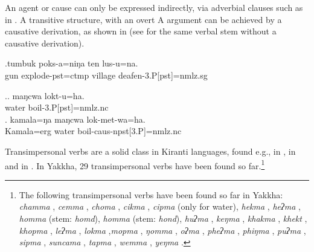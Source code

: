  An agent or cause can only be expressed indirectly, via adverbial clauses such as in \Next. A transitive structure, with an overt A argument can be achieved by a causative derivation, as shown in \NNext[b] (see \Next[a] for the same verbal stem without a causative derivation). 
 
 \exg.tumbuk poks-a=niŋa ten lus-u=na.\\
gun explode{\sc [3sg]-pst=ctmp} village  deafen{\sc -3.P[pst]=nmlz.sg}\\


 
\ex.\ag. maŋcwa lokt-u=ha.\\
water boil{\sc -3.P[pst]=nmlz.nc}\\
\bg. kamala=ŋa maŋcwa lok-met-wa=ha.\\
Kamala{\sc =erg} water boil{\sc -caus-npst[3.P]=nmlz.nc}\\


Transimpersonal verbs are a solid class in Kiranti languages, found e.g., in  \citep[451]{Driem1987A-grammar}, in  \citep[42]{Allen1975Sketch} and in  \citep[222]{Doornenbal2009A-grammar}. In Yakkha, 29 transimpersonal verbs have been found so far.\footnote{The following transimpersonal verbs have been found so far in Yakkha: \emph{chamma} , \emph{cemma} , \emph{choma} , \emph{cikma} ,  \emph{cipma}  (only for water),  \emph{hekma} , \emph{heʔma} , \emph{homma} (stem: \emph{homd}), \emph{homma}  (stem: \emph{hond}), \emph{huʔma} , \emph{keŋma} , \emph{khakma} , \emph{khekt} , \emph{khopma} , \emph{leʔma} ,   \emph{lokma} ,\emph{mopma} , \emph{ŋomma} ,   \emph{oʔma} ,  \emph{pheʔma} , \emph{phiŋma} , \emph{puʔma} ,   \emph{sipma} , 
 \emph{suncama} , \emph{tapma} , \emph{wemma} , \emph{yeŋma} .} 



